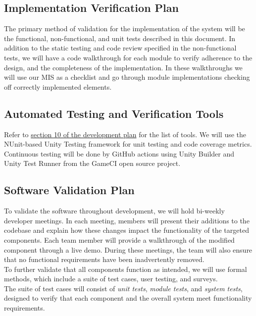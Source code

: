 \documentclass[12pt, titlepage]{article}
\begin{document}
\subsection{Implementation Verification Plan}

The primary method of validation for the implementation of the system will be the functional, non-functional, and unit tests described in this document. In addition to the static testing and code review specified in the non-functional tests, we will have a code walkthrough for each module to verify adherence to the design, and the completeness of the implementation. In these walkthroughs we will use our MIS as a checklist and go through module implementations checking off correctly implemented elements.

\subsection{Automated Testing and Verification Tools}

Refer to \href{https://github.com/russellrd/realm/blob/main/docs/DevelopmentPlan/DevelopmentPlan.pdf}{section 10 of the development plan} for the list of tools. We will use the NUnit-based Unity Testing framework for unit testing and code coverage metrics. Continuous testing will be done by GitHub actions using Unity Builder and Unity Test Runner from the GameCI open source project.

\subsection{Software Validation Plan}

To validate the software throughout development, we will hold bi-weekly developer meetings. In each meeting, members will present their additions to the codebase and explain how these changes impact the functionality of the targeted components. Each team member will provide a walkthrough of the modified component through a live demo. During these meetings, the team will also ensure that no functional requirements have been inadvertently removed. \\

To further validate that all components function as intended, we will use formal methods, which include a suite of test cases, user testing, and surveys. \\

The suite of test cases will consist of \textit{unit tests}, \textit{module tests}, and \textit{system tests}, designed to verify that each component and the overall system meet functionality requirements. \\
\end{document}
